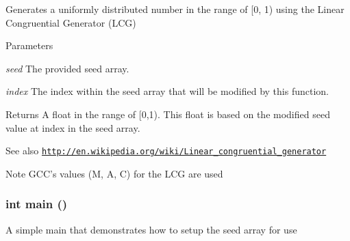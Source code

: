 Generates a uniformly distributed number in the range of \mbox{[}0, 1) using the Linear Congruential Generator (LCG) 
\begin{DoxyParams}{Parameters}
\item[{\em seed}]The provided seed array. \item[{\em index}]The index within the seed array that will be modified by this function. \end{DoxyParams}
\begin{DoxyReturn}{Returns}
A float in the range of \mbox{[}0,1). This float is based on the modified seed value at index in the seed array. 
\end{DoxyReturn}
\begin{DoxySeeAlso}{See also}
\href{http://en.wikipedia.org/wiki/Linear_congruential_generator}{\tt http://en.wikipedia.org/wiki/Linear\_\-congruential\_\-generator} 
\end{DoxySeeAlso}
\begin{DoxyNote}{Note}
GCC's values (M, A, C) for the LCG are used 
\end{DoxyNote}
\hypertarget{rng_8cu_ae66f6b31b5ad750f1fe042a706a4e3d4}{
\subsubsection[{main}]{\setlength{\rightskip}{0pt plus 5cm}int main ()}}
\label{rng_8cu_ae66f6b31b5ad750f1fe042a706a4e3d4}
A simple main that demonstrates how to setup the seed array for use 